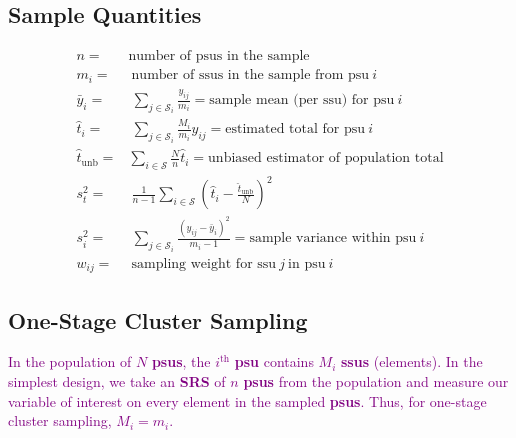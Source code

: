 \documentclass[a4paper,twoside,11pt]{article}
\begin{document}
\subsection{Sample Quantities}
\begin{equation*}
\begin{aligned}
n =& \text{number of psus in the sample} \\
m_i =& \ \text{number of ssus in the sample from psu} \ i \\
\bar{y}_i =& \  \sum_{j \in \mathcal{S}_i} \frac{y_{ij}}{m_i} = \text{sample mean (per ssu) for psu} \ i \\
\hat{t}_i =& \ \sum_{j \in \mathcal{S}_i} \frac{M_i}{m_i} y_{ij} = \text{estimated total for psu} \ i \\
\hat{t}_{\text{unb}} =& \sum_{i \in \mathcal{S}} \frac{N}{n} \hat{t}_i = \text{unbiased estimator of population total} \\
s_t^2 =& \ \frac{1}{n-1} \sum_{i \in \mathcal{S}}(\hat{t}_i - \frac{\hat{t}_{\text{unb}}}{N})^2 \\
s_i^2 =& \ \sum_{j \in \mathcal{S}_i} \frac{(y_{ij}-\bar{y}_i)^2}{m_i -1} = \text{sample variance within psu} \ i \\
w_{ij} =& \ \text{sampling weight for ssu} \ j \ \text{in psu} \ i
\end{aligned}
\end{equation*}
\subsection{One-Stage Cluster Sampling}
\textcolor{Purple}{In the population of $N$ \textbf{psus}, the $i^{\text{th}}$ \textbf{psu} contains $M_i$ \textbf{ssus} (elements). In the simplest design, we take an \textbf{SRS} of $n$ \textbf{psus} from the population and measure our variable of interest on every element in the sampled \textbf{psus}. Thus, for one-stage cluster sampling, $M_i=m_i$.}
\end{document}
